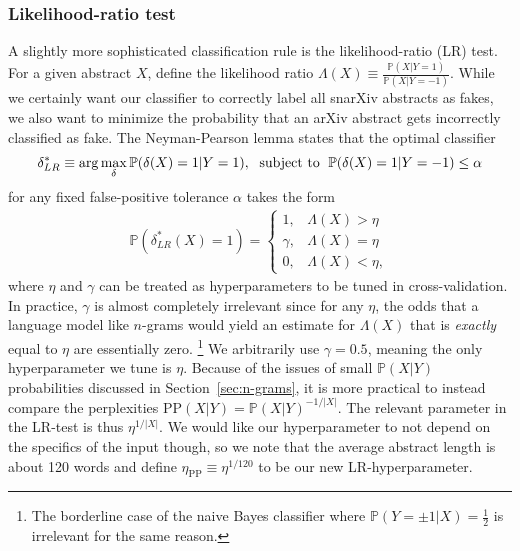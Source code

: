 \documentclass{article}
\renewcommand{\P}{\mathbb{P}}
\begin{document}
\subsubsection{Likelihood-ratio test}
A slightly more sophisticated classification rule is the likelihood-ratio (LR) test.
For a given abstract $X$, define the likelihood ratio $\Lambda(X)\equiv\frac{\P(X|Y=1)}{\P(X|Y=-1)}$.
While we certainly want our classifier to correctly label all snarXiv abstracts as fakes, we also want to minimize the probability that an arXiv abstract gets incorrectly classified as fake.
The Neyman-Pearson lemma states that the optimal classifier
\begin{align}
  \delta_{LR}^* \equiv \arg\max_\delta \P(\delta(X)=1|Y=1), \text{\; subject to \;} \P(\delta(X)=1|Y=-1)\leq \alpha
\end{align}
for any fixed false-positive tolerance $\alpha$ takes the form
\begin{align}
  \P\left(\delta_{LR}^*(X)=1\right) =
  \begin{cases}
    1,  & \Lambda(X) > \eta \\
    \gamma, & \Lambda(X) = \eta \\
    0,  & \Lambda(X) < \eta,
  \end{cases}
\end{align}
where $\eta$ and $\gamma$ can be treated as hyperparameters to be tuned in cross-validation.
In practice, $\gamma$ is almost completely irrelevant since for any $\eta$, the odds that a language model like $n$-grams would yield an estimate for $\Lambda(X)$ that is \textit{exactly} equal to $\eta$ are essentially zero.%
\footnote{The borderline case of the naive Bayes classifier where $\P(Y=\pm1|X)=\frac{1}{2}$ is irrelevant for the same reason.}
%
We arbitrarily use $\gamma=0.5$, meaning the only hyperparameter we tune is $\eta$.
Because of the issues of small $\P(X|Y)$ probabilities discussed in Section~\ref{sec:n-grams}, it is more practical to instead compare the perplexities $\text{PP}(X|Y)=\P(X|Y)^{-1/|X|}$.
The relevant parameter in the LR-test is thus $\eta^{1/|X|}$. We would like our hyperparameter to not depend on the specifics of the input though, so we note that the average abstract length is about 120 words and define $\eta_\text{PP}\equiv \eta^{1/120}$ to be our new LR-hyperparameter.
\end{document}
